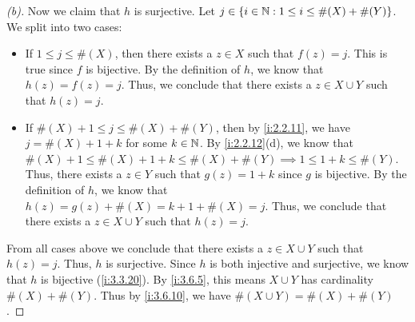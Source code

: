 \begin{proof}[(b)]
  Now we claim that \(h\) is surjective.
  Let \(j \in \left\lbrace i \in \mathbb{N} : 1 \leq i \leq \#(X) + \#(Y)\right\rbrace\).
  We split into two cases:
  \begin{itemize}
    \item If \(1 \leq j \leq \#(X)\), then there exists a \(z \in X\) such that \(f(z) = j\).
          This is true since \(f\) is bijective.
          By the definition of \(h\), we know that \(h(z) = f(z) = j\).
          Thus, we conclude that there exists a \(z \in X \cup Y\) such that \(h(z) = j\).
    \item If \(\#(X) + 1 \leq j \leq \#(X) + \#(Y)\), then by \cref{i:2.2.11}, we have \(j = \#(X) + 1 + k\) for some \(k \in \mathbb{N}\).
          By \cref{i:2.2.12}(d), we know that \(\#(X) + 1 \leq \#(X) + 1 + k \leq \#(X) + \#(Y) \implies 1 \leq 1 + k \leq \#(Y)\).
          Thus, there exists a \(z \in Y\) such that \(g(z) = 1 + k\) since \(g\) is bijective.
          By the definition of \(h\), we know that \(h(z) = g(z) + \#(X) = k + 1 + \#(X) = j\).
          Thus, we conclude that there exists a \(z \in X \cup Y\) such that \(h(z) = j\).
  \end{itemize}
  From all cases above we conclude that there exists a \(z \in X \cup Y\) such that \(h(z) = j\).
  Thus, \(h\) is surjective.
  Since \(h\) is both injective and surjective, we know that \(h\) is bijective (\cref{i:3.3.20}).
  By \cref{i:3.6.5}, this means \(X \cup Y\) has cardinality \(\#(X) + \#(Y)\).
  Thus by \cref{i:3.6.10}, we have \(\#(X \cup Y) = \#(X) + \#(Y)\).
\end{proof}


